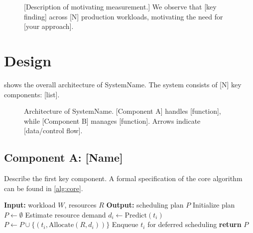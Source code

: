 \documentclass[letterpaper,twocolumn,10pt]{article}
\newcommand{\system}{SystemName\xspace}
\begin{document}
\begin{figure}[t]
  \centering
  \caption{[Description of motivating measurement.] We observe that
    [key finding] across [N] production workloads, motivating the need
    for [your approach].}
  \label{fig:motivation}
\end{figure}

\section{Design}
\label{sec:design}


 shows the overall architecture of \system.
The system consists of [N] key components: [list].

\begin{figure}[t]
  \centering
  \caption{Architecture of \system. [Component A] handles [function],
    while [Component B] manages [function]. Arrows indicate [data/control flow].}
  \label{fig:architecture}
\end{figure}

\subsection{Component A: [Name]}

Describe the first key component. A formal specification of the core
algorithm can be found in \cref{alg:core}.

\begin{algorithm}[t]
  \caption{Core algorithm of \system}
  \label{alg:core}
  \begin{algorithmic}[1]
    \STATE \textbf{Input:} workload $W$, resources $R$
    \STATE \textbf{Output:} scheduling plan $P$
    \STATE Initialize plan $P \leftarrow \emptyset$
      \STATE Estimate resource demand $d_i \leftarrow \text{Predict}(t_i)$
        \STATE $P \leftarrow P \cup \{(t_i, \text{Allocate}(R, d_i))\}$
      \ELSE
        \STATE Enqueue $t_i$ for deferred scheduling
      \ENDIF
    \ENDFOR
    \STATE \textbf{return} $P$
  \end{algorithmic}
\end{algorithm}
\end{document}
